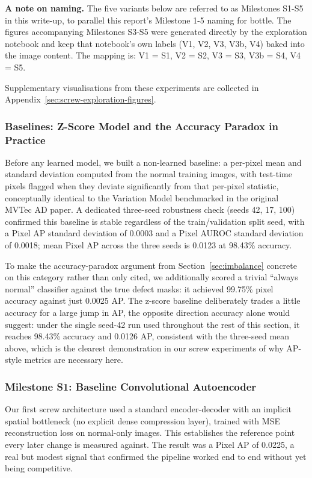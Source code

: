\textbf{A note on naming.} The five variants below are referred to as
Milestones S1-S5 in this write-up, to parallel this report's Milestone
1-5 naming for bottle. The figures accompanying Milestones S3-S5 were
generated directly by the exploration notebook and keep that notebook's
own labels (V1, V2, V3, V3b, V4) baked into the image content. The
mapping is: V1 = S1, V2 = S2, V3 = S3, V3b = S4, V4 = S5. 

Supplementary visualisations from these experiments are collected in
Appendix~\ref{sec:screw-exploration-figures}.

\subsubsection{Baselines: Z-Score Model and the Accuracy Paradox in Practice}

Before any learned model, we built a non-learned baseline: a per-pixel mean and
standard deviation computed from the normal training images, with test-time
pixels flagged when they deviate significantly from that per-pixel statistic,
conceptually identical to the Variation Model benchmarked in the original
MVTec AD paper. A dedicated three-seed robustness check (seeds 42, 17, 100)
confirmed this baseline is stable regardless of the train/validation split
seed, with a Pixel AP standard deviation of 0.0003 and a Pixel AUROC standard
deviation of 0.0018; mean Pixel AP across the three seeds is 0.0123 at 98.43\%
accuracy.

To make the accuracy-paradox argument from Section~\ref{sec:imbalance} concrete on this
category rather than only cited, we additionally scored a trivial
``always normal'' classifier against the true defect masks: it achieved
99.75\% pixel accuracy against just 0.0025 AP. The z-score baseline
deliberately trades a little accuracy for a large jump in AP, the opposite
direction accuracy alone would suggest: under the single seed-42 run used
throughout the rest of this section, it reaches 98.43\% accuracy and 0.0126
AP, consistent with the three-seed mean above, which is the clearest
demonstration in our screw experiments of why AP-style metrics are
necessary here.

\subsubsection{Milestone S1: Baseline Convolutional Autoencoder}

Our first screw architecture used a standard encoder-decoder with an implicit
spatial bottleneck (no explicit dense compression layer), trained with MSE
reconstruction loss on normal-only images. This establishes the reference
point every later change is measured against. The result was a Pixel AP of
0.0225, a real but modest signal that confirmed the pipeline worked end to end
without yet being competitive.

